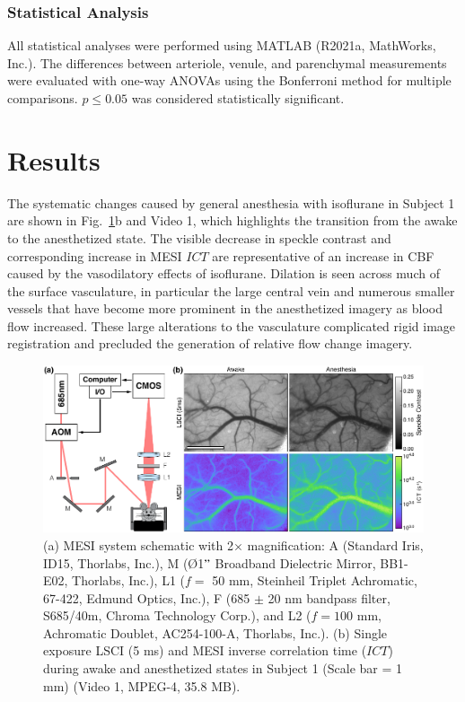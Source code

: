 \documentclass[review]{elsarticle}
\begin{document}
\subsubsection{Statistical Analysis}
All statistical analyses were performed using MATLAB (R2021a, MathWorks, Inc.). The differences between arteriole, venule, and parenchymal measurements were evaluated with one-way ANOVAs using the Bonferroni method for multiple comparisons. $p \leq 0.05$ was considered statistically significant.


\section{Results}

The systematic changes caused by general anesthesia with isoflurane in Subject 1 are shown in Fig.~\ref{fig:system}b and Video 1, which highlights the transition from the awake to the anesthetized state. The visible decrease in speckle contrast and corresponding increase in MESI $ICT$ are representative of an increase in CBF caused by the vasodilatory effects of isoflurane. Dilation is seen across much of the surface vasculature, in particular the large central vein and numerous smaller vessels that have become more prominent in the anesthetized imagery as blood flow increased. These large alterations to the vasculature complicated rigid image registration and precluded the generation of relative flow change imagery.

\begin{figure}
    \includegraphics[width=\textwidth]{Figure1.pdf}
    \caption {
        (a) MESI system schematic with 2$\times$ magnification: A (Standard Iris, ID15, Thorlabs, Inc.), M ({{\O}}1$"$ Broadband Dielectric Mirror, BB1-E02, Thorlabs, Inc.), L1 ($f =$ 50 mm, Steinheil Triplet Achromatic, 67-422, Edmund Optics, Inc.), F (685 $\pm$ 20 nm bandpass filter, S685/40m, Chroma Technology Corp.), and L2 ($f = 100$ mm, Achromatic Doublet, AC254-100-A, Thorlabs, Inc.). (b) Single exposure LSCI (5 ms) and MESI inverse correlation time ($ICT$) during awake and anesthetized states in Subject 1 (Scale bar = 1 mm) (Video 1, MPEG-4, 35.8 MB).
    }
    \label{fig:system}
\end{figure}
\end{document}
